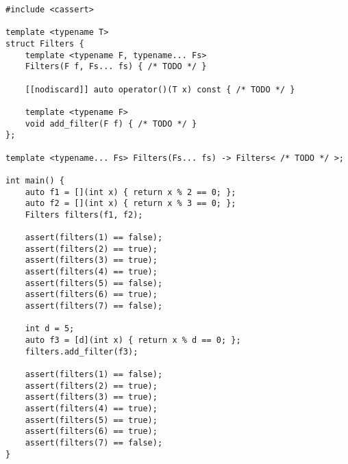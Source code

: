 \begin{lstlisting}[title=\href{https://godbolt.org/z/qBNWXD}{\texttt{godbolt.org/z/qBNWXD}}]
#include <cassert>

template <typename T>
struct Filters {
    template <typename F, typename... Fs>
    Filters(F f, Fs... fs) { /* TODO */ }

    [[nodiscard]] auto operator()(T x) const { /* TODO */ }

    template <typename F>
    void add_filter(F f) { /* TODO */ }
};

template <typename... Fs> Filters(Fs... fs) -> Filters< /* TODO */ >;

int main() {
    auto f1 = [](int x) { return x % 2 == 0; };
    auto f2 = [](int x) { return x % 3 == 0; };
    Filters filters(f1, f2);

    assert(filters(1) == false);
    assert(filters(2) == true);
    assert(filters(3) == true);
    assert(filters(4) == true);
    assert(filters(5) == false);
    assert(filters(6) == true);
    assert(filters(7) == false);

    int d = 5;
    auto f3 = [d](int x) { return x % d == 0; };
    filters.add_filter(f3);

    assert(filters(1) == false);
    assert(filters(2) == true);
    assert(filters(3) == true);
    assert(filters(4) == true);
    assert(filters(5) == true);
    assert(filters(6) == true);
    assert(filters(7) == false);
}
\end{lstlisting}
